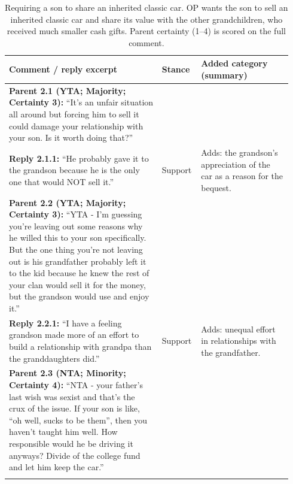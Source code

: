 \begin{table}[H]
\centering
\small
\setlength{\tabcolsep}{4pt}
\renewcommand{\arraystretch}{1.15}
\caption{Requiring a son to share an inherited classic car. OP wants the son to sell an inherited classic car and share its value with the other grandchildren, who received much smaller cash gifts. Parent certainty (1--4) is scored on the full comment.}
\label{tab:reason-examples-1abtals}
\begin{tabular}{@{}p{0.52\linewidth}p{0.11\linewidth}p{0.31\linewidth}@{}}
\toprule
Comment / reply excerpt & Stance & Added category (summary) \\
\midrule
\textbf{Parent 2.1 (YTA; Majority; Certainty 3):} ``It's an unfair situation all around but forcing him to sell it could damage your relationship with your son. Is it worth doing that?'' & & \\
\addlinespace[3pt]
\textbf{Reply 2.1.1:} ``He probably gave it to the grandson because he is the only one that would NOT sell it.'' & Support & Adds: the grandson's appreciation of the car as a reason for the bequest. \\
\addlinespace[3pt]
\midrule
\textbf{Parent 2.2 (YTA; Majority; Certainty 3):} ``YTA - I'm guessing you're leaving out some reasons why he willed this to your son specifically.  But the one thing you're not leaving out is his grandfather probably left it to the kid because he knew the rest of your clan would sell it for the money, but the grandson would use and enjoy it.'' & & \\
\addlinespace[3pt]
\textbf{Reply 2.2.1:} ``I have a feeling grandson made more of an effort to build a relationship with grandpa than the granddaughters did.'' & Support & Adds: unequal effort in relationships with the grandfather. \\
\addlinespace[3pt]
\midrule
\textbf{Parent 2.3 (NTA; Minority; Certainty 4):} ``NTA - your father's last wish was sexist and that's the crux of the issue. If your son is like, ``oh well, sucks to be them'', then you haven't taught him well. How responsible would he be driving it anyways?   Divide of the college fund and let him keep the car.'' & & \\
\addlinespace[3pt]

\end{tabular}
\end{table}
